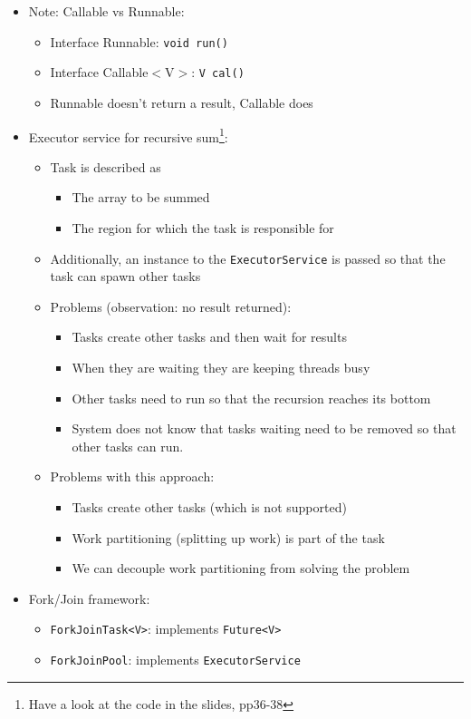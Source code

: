 \documentclass[a4paper]{article}
\newcommand{\inline}[1]{\lstinline!#1!}%
\begin{document}
\begin{itemize}
\item Note: Callable vs Runnable:
\begin{itemize}
\item Interface Runnable: \inline{void run()}
\item Interface Callable$<$V$>$: \inline{V cal()}
\item Runnable doesn’t return a result, Callable does
\end{itemize}
\item Executor service for recursive sum\footnote{Have a look at the code in the slides, pp36-38}: 
\begin{itemize}
\item Task is described as 
\begin{itemize}
\item The array to be summed
\item The region for which the task is responsible for
\end{itemize}
\item Additionally, an instance to the \inline{ExecutorService} is passed so that the task can spawn other tasks
\item Problems (observation: no result returned): 
\begin{itemize}
\item Tasks create other tasks and then wait for results
\item When they are waiting they are keeping threads busy
\item Other tasks need to run so that the recursion reaches its bottom
\item System does not know that tasks waiting need to be removed so that other tasks can run. 
\end{itemize}
\item Problems with this approach:
\begin{itemize}
\item Tasks create other tasks (which is not supported)
\item Work partitioning (splitting up work) is part of the task
\item We can decouple work partitioning from solving the problem
\end{itemize}
\end{itemize}
\item Fork/Join framework:
\begin{itemize}
\item \inline{ForkJoinTask<V>}: implements \inline{Future<V>}
\item \inline{ForkJoinPool}: implements \inline{ExecutorService}

\end{itemize}
\end{itemize}
\end{document}
